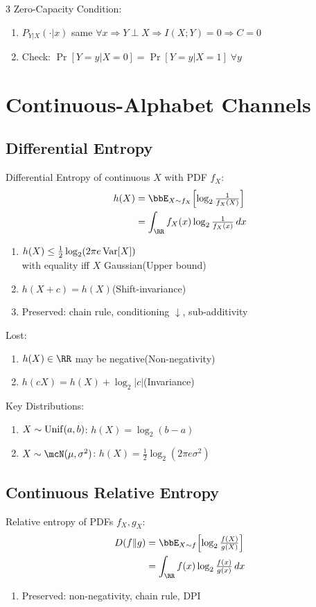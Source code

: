 \documentclass[12pt, a4paper]{article}
\begin{document}
\begin{multicols*}{3}
Zero-Capacity Condition:
\begin{enumerate}[\roman*.]
  \item $P_{Y|X}(\cdot|x)$ same $\forall x\Rightarrow Y\perp X\Rightarrow I(X;Y)=0\Rightarrow C=0$
  \item Check: $\Pr[Y=y|X=0]=\Pr[Y=y|X=1]\;\forall y$
\end{enumerate}
\colbreak
\section{Continuous-Alphabet Channels}
\subsection{Differential Entropy}
Differential Entropy of continuous $X$ with PDF $f_X$:
\begin{align*}
  h(X)&=\E_{X\sim f_X}\!\left[\log_2\tfrac{1}{f_X(X)}\right]\\ 
      &=\int_{\RR}f_X(x)\log_2\tfrac{1}{f_X(x)}\,dx
\end{align*}
\begin{enumerate}[\roman*.]
  \item $h(X) \leq \tfrac{1}{2}\log_2(2\pi e\operatorname{Var}[X])$\\with equality iff $X$ Gaussian\hfill(Upper bound)
  \item $h(X+c)=h(X)$\hfill(Shift-invariance)
  \item Preserved: chain rule, conditioning $\downarrow$, sub-additivity
\end{enumerate}
Lost:
\begin{enumerate}[\roman*.]
  \item $h(X)\in\RR$ may be negative\hfill(Non-negativity)
  \item $h(cX)=h(X)+\log_2|c|$\hfill(Invariance)
\end{enumerate}
 
Key Distributions:
\begin{enumerate}[\roman*.]
  \item $X\sim\operatorname{Unif}(a,b)$: $h(X)=\log_2(b-a)$
  \item $X\sim\mcN(\mu,\sigma^2)$: $h(X)=\tfrac{1}{2}\log_2(2\pi e\sigma^2)$
\end{enumerate}

\subsection{Continuous Relative Entropy}
Relative entropy of PDFs $f_X,g_X$:
\begin{align*}
  D(f\|g)&=\E_{X\sim f}\!\left[\log_2\tfrac{f(X)}{g(X)}\right]\\
         &=\int_{\RR}f(x)\log_2\tfrac{f(x)}{g(x)}\,dx
\end{align*}
\begin{enumerate}[\roman*.]
  \item Preserved: non-negativity, chain rule, DPI
\end{enumerate}


\end{multicols*}
\end{document}
